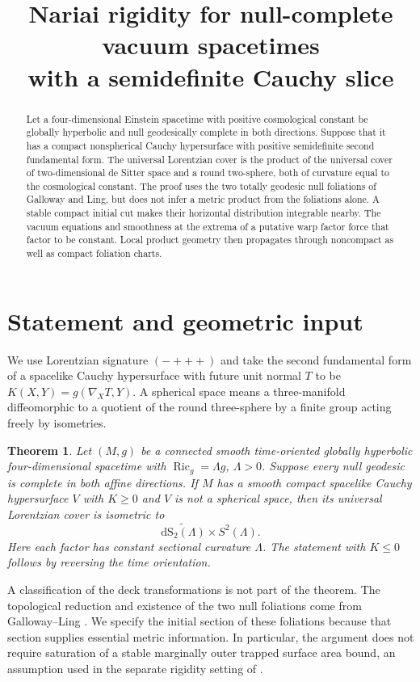 \documentclass[11pt]{article}
\title{Nariai rigidity for null-complete vacuum spacetimes\\with a semidefinite Cauchy slice}
\author{}
\date{}
\newtheorem{theorem}{Theorem}
\DeclareMathOperator{\Ric}{Ric}
\newcommand{\dS}{\mathrm{dS}}
\begin{document}
\maketitle

\begin{abstract}
Let a four-dimensional Einstein spacetime with positive cosmological
constant be globally hyperbolic and null geodesically complete in both
directions. Suppose that it has a compact nonspherical Cauchy hypersurface
with positive semidefinite second fundamental form. The universal
Lorentzian cover is the product of the universal cover of two-dimensional
de Sitter space and a round two-sphere, both of curvature equal to the
cosmological constant. The proof uses the two totally geodesic null
foliations of Galloway and Ling, but does not infer a metric product from
the foliations alone. A stable compact initial cut makes their horizontal
distribution integrable nearby. The vacuum equations and smoothness at
the extrema of a putative warp factor force that factor to be constant.
Local product geometry then propagates through noncompact as well as
compact foliation charts.
\end{abstract}

\section{Statement and geometric input}

We use Lorentzian signature $(-+++)$ and take the second fundamental form
of a spacelike Cauchy hypersurface with future unit normal $T$ to be
$K(X,Y)=g(\nabla_X T,Y)$. A spherical space means a three-manifold
diffeomorphic to a quotient of the round three-sphere by a finite group
acting freely by isometries.

\begin{theorem}\label{thm:main}
Let $(M,g)$ be a connected smooth time-oriented globally hyperbolic
four-dimensional spacetime with $\Ric_g=\Lambda g$, $\Lambda>0$.
Suppose every null geodesic is complete in both affine directions.
If $M$ has a smooth compact spacelike Cauchy hypersurface $V$ with
$K\geq 0$ and $V$ is not a spherical space, then its universal
Lorentzian cover is isometric to
\[
   \widetilde{\dS_2(\Lambda)}\times S^2(\Lambda).
\]
Here each factor has constant sectional curvature $\Lambda$. The
statement with $K\leq 0$ follows by reversing the time orientation.
\end{theorem}

A classification of the deck transformations is not part of the theorem.
The topological reduction and existence of the two null foliations come
from Galloway--Ling \cite{GLcos,GLpen}. We specify the initial section of
these foliations because that section supplies essential metric
information. In particular, the argument does not require saturation of
a stable marginally outer trapped surface area bound, an assumption
used in the separate rigidity setting of \cite{GM}.
\end{document}
